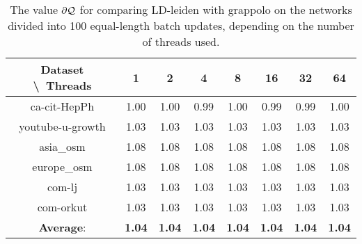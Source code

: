 \begin{table}[H]
	\centering
	\begin{tabular}{|c|c|c|c|c|c|c|c|}
		\hline
		Dataset \textbackslash\ Threads & 1 & 2 & 4 & 8 & 16 & 32 & 64 \\
		\hline
		ca-cit-HepPh & 1.00 & 1.00 & 0.99 & 1.00 & 0.99 & 0.99 & 1.00 \\
		\hline
		youtube-u-growth & 1.03 & 1.03 & 1.03 & 1.03 & 1.03 & 1.03 & 1.03 \\
		\hline
		asia\_osm & 1.08 & 1.08 & 1.08 & 1.08 & 1.08 & 1.08 & 1.08 \\
		\hline
		europe\_osm & 1.08 & 1.08 & 1.08 & 1.08 & 1.08 & 1.08 & 1.08 \\
		\hline
		com-lj & 1.03 & 1.03 & 1.03 & 1.03 & 1.03 & 1.03 & 1.03 \\
		\hline
		com-orkut & 1.03 & 1.03 & 1.03 & 1.03 & 1.03 & 1.03 & 1.03 \\
		\hline
		\textbf{Average}: & \textbf{1.04} & \textbf{1.04} & \textbf{1.04} & \textbf{1.04} & \textbf{1.04} & \textbf{1.04} & \textbf{1.04} \\
		\hline
	\end{tabular}
\caption{The value $\partial\mathcal{Q}$ for comparing LD-leiden with grappolo on the networks divided into 100 equal-length batch updates, depending on the number of threads used.}
\label{T:scalling:lastM:100:LD-leiden to grappolo}
\end{table}